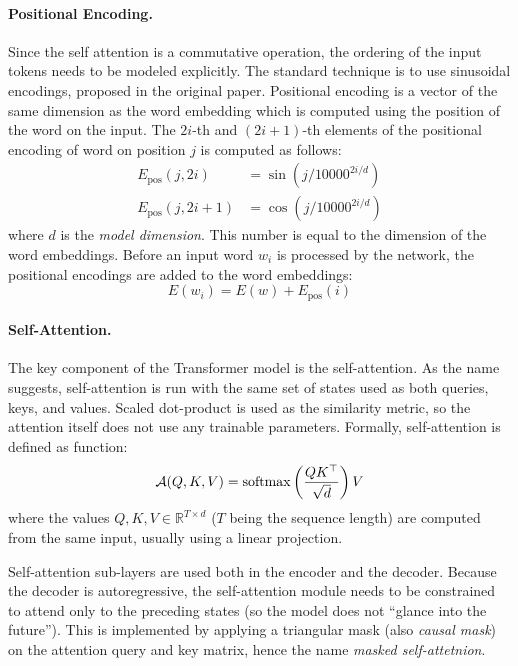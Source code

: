 \paragraph{Positional Encoding.} Since the self attention is a commutative
operation, the ordering of the input tokens needs to be modeled explicitly.
The standard technique is to use sinusoidal encodings, proposed in the original
paper. Positional encoding is a vector of the same dimension as the word
embedding which is computed using the position of the word on the input.
The $2i$-th and $(2i+1)$-th elements of the positional encoding of word on
position $j$ is computed as follows:
%
\begin{equation}
  \begin{split}
    E_{\text{pos}}(j, 2i) &= \sin(j / 10000^{2i/d}) \\
    E_{\text{pos}}(j, 2i + 1) &= \cos(j / 10000^{2i/d})
  \end{split}
\end{equation}
%
where $d$ is the \emph{model dimension}. This number is equal to the dimension
of the word embeddings. Before an input word $w_i$ is processed by the network,
the positional encodings are added to the word embeddings:
\begin{equation}
  E(w_i) = E(w) + E_{\text{pos}}(i)
\end{equation}

\paragraph{Self-Attention.} The key component of the Transformer model is the
self-attention. As the name suggests, self-attention is run with the same set
of states used as both queries, keys, and values. Scaled dot-product is used as
the similarity metric, so the attention itself does not use any trainable
parameters. Formally, self-attention is defined as function:
%
\begin{equation}
  \mathcal{A}(Q,K,V) = \operatorname*{softmax} \left( \frac{QK^\top}{\sqrt{d}} \right) V
  \label{eq:scaled-dot-product}
\end{equation}
%
where the values $Q, K, V \in \mathbb{R}^{T \times d}$ ($T$ being the sequence
length) are computed from the same input, usually using a linear projection.

Self-attention sub-layers are used both in the encoder and the decoder. Because
the decoder is autoregressive, the self-attention module needs to be
constrained to attend only to the preceding states (so the model does not
``glance into the future''). This is implemented by applying a triangular mask
(also \emph{causal mask}) on the attention query and key matrix, hence the name
\emph{masked self-attetnion}.

